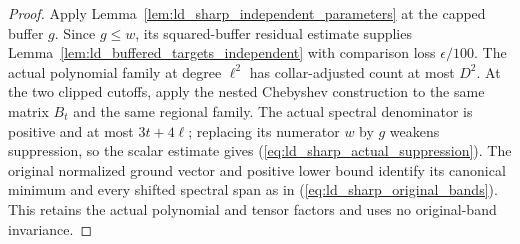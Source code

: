 \begin{proof}\leanok
    Apply Lemma~\ref{lem:ld_sharp_independent_parameters} at the capped
    buffer $g$. Since $g\le w$, its squared-buffer residual estimate
    supplies Lemma~\ref{lem:ld_buffered_targets_independent} with
    comparison loss $\epsilon/100$. The actual polynomial family at
    degree $\ell^2$ has collar-adjusted count at most $D^2$.
    At the two clipped cutoffs, apply the nested Chebyshev construction
    to the same matrix $B_t$ and the same regional family.
    The actual spectral denominator is positive and at most $3t+4\ell$;
    replacing its numerator $w$ by $g$ weakens suppression, so the scalar
    estimate gives (\ref{eq:ld_sharp_actual_suppression}).
    The original normalized ground vector and positive lower bound
    identify its canonical minimum and every shifted spectral span as in
    (\ref{eq:ld_sharp_original_bands}). This retains the actual polynomial
    and tensor factors and uses no original-band invariance.
\end{proof}
